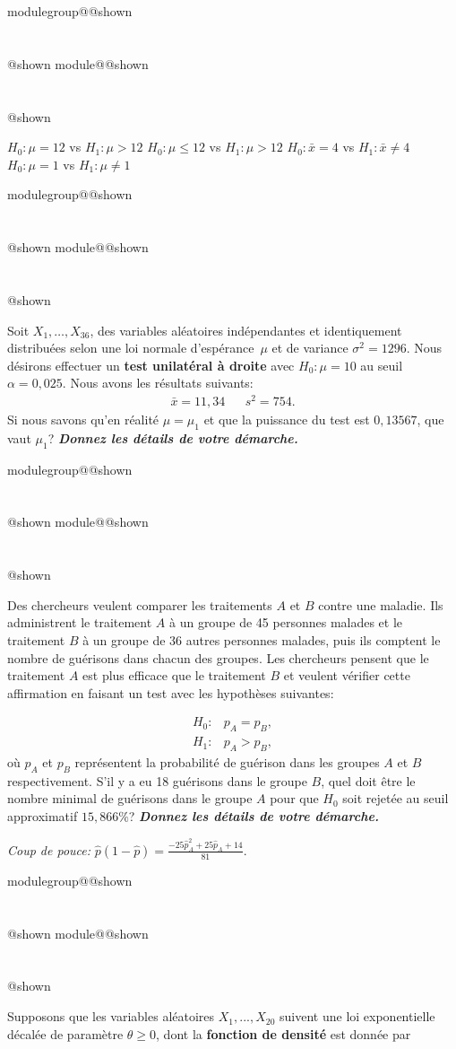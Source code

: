 \documentclass{Evaluation}
\makeatletter
\newcommand{\currentmodulekey}{}
\newcommand{\currentmoduletitle}{}
\newcommand{\currentgroupkey}{}
\newcommand{\currentgrouptitle}{}
\newcommand{\showmoduleifneeded}{%
  \ifx\currentgroupkey\empty\else
    \expandafter\ifx\csname modulegroup@\currentgroupkey @shown\endcsname\relax
      \section*{\currentgrouptitle}%
      \expandafter\gdef\csname modulegroup@\currentgroupkey @shown\endcsname{1}%
    \fi
  \fi
  \expandafter\ifx\csname module@\currentmodulekey @shown\endcsname\relax
    \section*{\currentmoduletitle}%
    \expandafter\gdef\csname module@\currentmodulekey @shown\endcsname{1}%
  \fi
}
\newenvironment{H23}{\showmoduleifneeded}{}
\makeatother
\begin{document}
\begin{questions}
\begin{H23}
\begin{checkboxes}
\correctchoice $H_0 : \mu = 12$ vs $H_1 : \mu > 12$
\choice $H_0 : \mu \leq 12$ vs $H_1 : \mu > 12$
\choice $H_0 : \bar{x} = 4$ vs $H_1 : \bar{x} \ne 4$
\correctchoice $H_0: \mu = 1$ vs $H_1: \mu \neq 1$
\end{checkboxes}
\end{H23}

\begin{H23}
\question {} %
Soit $X_1,\hdots, X_{36}$, des variables aléatoires indépendantes et identiquement distribuées selon une loi normale d'espérance~$\mu$ et de variance $\sigma^2=1296$.
Nous désirons effectuer un \textbf{test unilatéral à droite} avec $H_0:\mu=10$ au seuil $\alpha = 0,025$.
Nous avons les résultats suivants:
\begin{align*}
    \bar{x}= 11,34 &  & s^2=754.
\end{align*}
Si nous savons qu'en réalité $\mu=\mu_1$ et que la puissance du test est $0,13567$, que vaut $\mu_1$? \textbf{\textit{Donnez les détails de votre démarche.}}
\end{H23}

\begin{H23}
\question {} %
Des chercheurs veulent comparer les traitements $A$ et $B$ contre une maladie.
Ils administrent le traitement $A$ à un groupe de 45 personnes malades et le traitement $B$ à un groupe de 36 autres personnes malades, puis ils comptent le nombre de guérisons dans chacun des groupes.
Les chercheurs pensent que le traitement $A$ est plus efficace que le traitement $B$ et veulent vérifier cette affirmation en faisant un test avec les hypothèses suivantes:

\begin{align*}
    H_0:&p_A=p_B,\\
    H_1:&p_A>p_B,
\end{align*}
où $p_A$ et $p_B$ représentent la probabilité de guérison dans les groupes $A$ et $B$ respectivement.
S'il y a eu 18 guérisons dans le groupe $B$, quel doit être le nombre minimal de guérisons dans le groupe $A$ pour que $H_0$ soit rejetée au seuil approximatif $15,866\%$? \textbf{\textit{Donnez les détails de votre démarche.}}

\textit{Coup de pouce:} $\displaystyle \hat{p}(1-\hat{p})=\frac{-25 \hat{p}_A^2+25 \hat{p}_A+14}{81}$.
\end{H23}

\begin{H23}
\question {} %
Supposons que les variables aléatoires $X_1,...,X_{20}$ suivent une loi exponentielle décalée de paramètre $\theta \geq0 $, dont la \textbf{fonction de densité} est donnée par 


\end{H23}
\end{questions}
\end{document}
